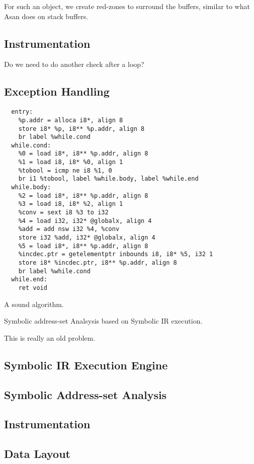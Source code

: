 For such an object, we create red-zones to surround the buffers, similar to what Asan does on stack buffers.

\subsection{Instrumentation}

Do we need to do another check after a loop?

\subsection{Exception Handling}


\begin{verbatim}
  entry:
    %p.addr = alloca i8*, align 8
    store i8* %p, i8** %p.addr, align 8
    br label %while.cond  
  while.cond:
    %0 = load i8*, i8** %p.addr, align 8
    %1 = load i8, i8* %0, align 1
    %tobool = icmp ne i8 %1, 0
    br i1 %tobool, label %while.body, label %while.end
  while.body:    
    %2 = load i8*, i8** %p.addr, align 8
    %3 = load i8, i8* %2, align 1
    %conv = sext i8 %3 to i32
    %4 = load i32, i32* @globalx, align 4
    %add = add nsw i32 %4, %conv
    store i32 %add, i32* @globalx, align 4
    %5 = load i8*, i8** %p.addr, align 8
    %incdec.ptr = getelementptr inbounds i8, i8* %5, i32 1
    store i8* %incdec.ptr, i8** %p.addr, align 8
    br label %while.cond  
  while.end:
    ret void
\end{verbatim}

A sound algorithm.

Symbolic address-set Analsysis based on Symbolic IR execution.

This is really an old problem.



\subsection{Symbolic IR Execution Engine}

\subsection{Symbolic Address-set Analysis}

\subsection{Instrumentation}

\subsection{Data Layout}



